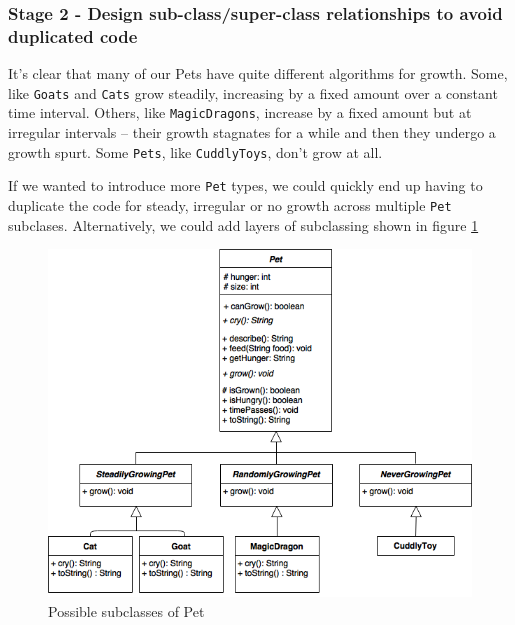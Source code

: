 \documentclass[
]{book}
\begin{document}
\hypertarget{stage-2---design-sub-classsuper-class-relationships-to-avoid-duplicated-code}{%
\subsubsection{Stage 2 - Design sub-class/super-class relationships to avoid duplicated code}\label{stage-2---design-sub-classsuper-class-relationships-to-avoid-duplicated-code}}

It's clear that many of our Pets have quite different algorithms for growth. Some, like \texttt{Goats} and \texttt{Cats} grow steadily, increasing by a fixed amount over a constant time interval. Others, like \texttt{MagicDragons}, increase by a fixed amount but at irregular intervals -- their growth stagnates for a while and then they undergo a growth spurt. Some \texttt{Pets}, like \texttt{CuddlyToys}, don't grow at all.

If we wanted to introduce more \texttt{Pet} types, we could quickly end up having to duplicate the code for steady, irregular or no growth across multiple \texttt{Pet} subclases. Alternatively, we could add layers of subclassing shown in figure \ref{fig:petsubclasses-fig}

\begin{figure}

{\centering \includegraphics[width=1\linewidth]{images/GrowthSubclasses} 

}

\caption{Possible subclasses of Pet}\label{fig:petsubclasses-fig}
\end{figure}
\end{document}
